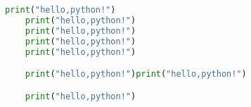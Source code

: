 \documentclass[UTF8]{ctexart}
\begin{document}
\begin{lstlisting}[language=python]
	print("hello,python!")
    print("hello,python!")
    print("hello,python!")
    print("hello,python!")
    print("hello,python!")

    print("hello,python!")print("hello,python!")

    print("hello,python!")
\end{lstlisting}	
\end{document}
